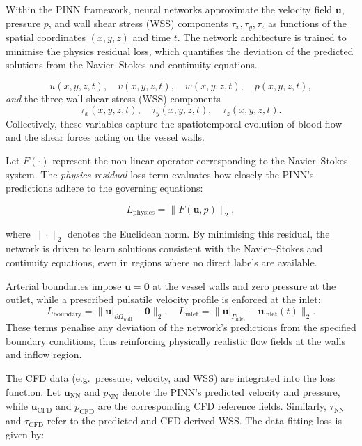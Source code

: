 \documentclass[12pt, a4paper]{article}
\begin{document}
Within the PINN framework, neural networks approximate the velocity field \(\mathbf{u}\), pressure \(p\), and wall shear stress (WSS) components \(\tau_x, \tau_y, \tau_z\) as functions of the spatial coordinates \((x,y,z)\) and time \(t\). The network architecture is trained to minimise the physics residual loss, which quantifies the deviation of the predicted solutions from the Navier--Stokes and continuity equations. 

\[
    u(x,y,z,t),\quad v(x,y,z,t),\quad w(x,y,z,t),\quad p(x,y,z,t),
\]
\emph{and} the three wall shear stress (WSS) components
\[
    \tau_x(x,y,z,t),\quad \tau_y(x,y,z,t),\quad \tau_z(x,y,z,t).
\]
Collectively, these variables capture the spatiotemporal evolution of blood flow and the shear forces acting on the vessel walls.

Let \(F(\cdot)\) represent the non-linear operator corresponding to the Navier--Stokes system. The \emph{physics residual} loss term evaluates how closely the PINN’s predictions adhere to the governing equations:

\begin{equation}
L_{\mathrm{physics}} = \bigl\|F(\mathbf{u}, p)\bigr\|_2,
\end{equation}

where \(\|\cdot\|_2\) denotes the Euclidean norm. By minimising this residual, the network is driven to learn solutions consistent with the Navier--Stokes and continuity equations, even in regions where no direct labels are available.

Arterial boundaries impose \(\mathbf{u}=\mathbf{0}\) at the vessel walls and zero pressure at the outlet, while a prescribed pulsatile velocity profile is enforced at the inlet:
\begin{equation}
L_{\mathrm{boundary}} = \|\mathbf{u}\big|_{\partial\Omega_{\text{wall}}} - \mathbf{0}\|_2, 
\quad
L_{\mathrm{inlet}} = \|\mathbf{u}\big|_{\Gamma_{\mathrm{inlet}}} - \mathbf{u}_{\mathrm{inlet}}(t)\|_2.
\end{equation}
These terms penalise any deviation of the network’s predictions from the specified boundary conditions, thus reinforcing physically realistic flow fields at the walls and inflow region.

The CFD data (e.g.\ pressure, velocity, and WSS) are integrated into the loss function. Let \(\mathbf{u}_{\mathrm{NN}}\) and \(p_{\mathrm{NN}}\) denote the PINN’s predicted velocity and pressure, while \(\mathbf{u}_{\mathrm{CFD}}\) and \(p_{\mathrm{CFD}}\) are the corresponding CFD reference fields. Similarly, \(\tau_{\mathrm{NN}}\) and \(\tau_{\mathrm{CFD}}\) refer to the predicted and CFD-derived WSS. The data-fitting loss is given by:
\end{document}
